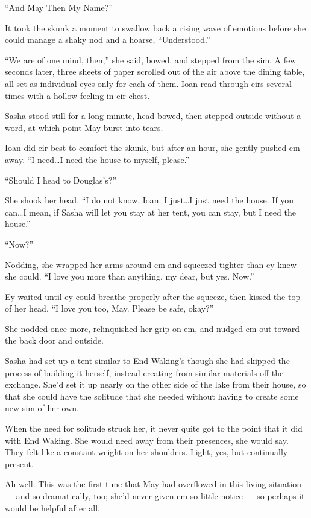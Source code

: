 ``And May Then My Name?''

It took the skunk a moment to swallow back a rising wave of emotions before she could manage a shaky nod and a hoarse, ``Understood.''

``We are of one mind, then,'' she said, bowed, and stepped from the sim. A few seconds later, three sheets of paper scrolled out of the air above the dining table, all set as individual-eyes-only for each of them. Ioan read through eirs several times with a hollow feeling in eir chest.

Sasha stood still for a long minute, head bowed, then stepped outside without a word, at which point May burst into tears.

Ioan did eir best to comfort the skunk, but after an hour, she gently pushed em away. ``I need\ldots I need the house to myself, please.''

``Should I head to Douglas's?''

She shook her head. ``I do not know, Ioan. I just\ldots I just need the house. If you can\ldots I mean, if Sasha will let you stay at her tent, you can stay, but I need the house.''

``Now?''

Nodding, she wrapped her arms around em and squeezed tighter than ey knew she could. ``I love you more than anything, my dear, but yes. Now.''

Ey waited until ey could breathe properly after the squeeze, then kissed the top of her head. ``I love you too, May. Please be safe, okay?''

She nodded once more, relinquished her grip on em, and nudged em out toward the back door and outside.

Sasha had set up a tent similar to End Waking's though she had skipped the process of building it herself, instead creating from similar materials off the exchange. She'd set it up nearly on the other side of the lake from their house, so that she could have the solitude that she needed without having to create some new sim of her own.

When the need for solitude struck her, it never quite got to the point that it did with End Waking. She would need away from their presences, she would say. They felt like a constant weight on her shoulders. Light, yes, but continually present.

Ah well. This was the first time that May had overflowed in this living situation — and so dramatically, too; she'd never given em so little notice — so perhaps it would be helpful after all.

